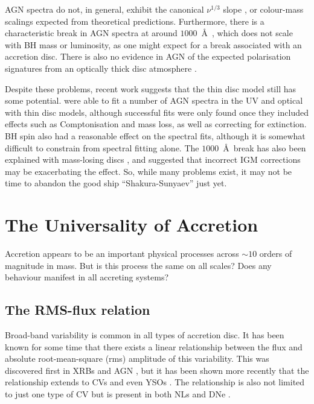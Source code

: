 AGN spectra do not, in general, exhibit the canonical $\nu^{1/3}$ slope
\citep[e.g.][]{koratkar1999,davis2007,shankar2016},
or colour-mass scalings \citep{bonning2007} 
expected from theoretical predictions. 
Furthermore, there is a characteristic break in AGN spectra at
around $1000$~\AA\ \citep{lusso2015}, which does not scale with BH mass or luminosity,
as one might expect for a break associated with an accretion disc. 
There is also no evidence in AGN of the expected polarisation signatures from an 
optically thick disc atmosphere \citep{stockman1979,antonucci1988,antonucci1996}. 

Despite these problems, recent work suggests that the thin disc model 
still has some potential. \cite{capellupo2015} were able to fit a number of
AGN spectra in the UV and optical with thin disc models, although successful fits
were only found once they included effects such as Comptonisation and mass loss,
as well as correcting for extinction. BH spin also had a reasonable effect on the 
spectral fits, although it is somewhat difficult to constrain from spectral fitting alone. The $1000$~\AA\ break has also been explained with mass-losing discs 
\citep{laordavis2014},
and \cite{lusso2015} suggested that incorrect IGM corrections 
may be exacerbating the effect.
So, while many problems exist, it may not be time to 
abandon the good ship ``Shakura-Sunyaev'' just yet.

\section{The Universality of Accretion}

Accretion appears to be an important physical processes across $\sim10$ orders
of magnitude in mass. But is this process the same on all scales? Does any 
behaviour manifest in all accreting systems? 

\subsection{The RMS-flux relation}

Broad-band variability is common in all types of accretion disc. It has been
known for some time that there exists a linear relationship
between the flux and absolute root-mean-square (rms) amplitude
of this variability. This was discovered first in XRBs and AGN 
\citep{uttley2001, uttley2005, heil2012}, but it has been shown
more recently that the relationship extends to CVs and even YSOs 
\citep{scaringi2012,scaringi2015a}. The relationship is also not limited
to just one type of CV but is present in both NLs and DNe \citep{vandesande2015}.
 
